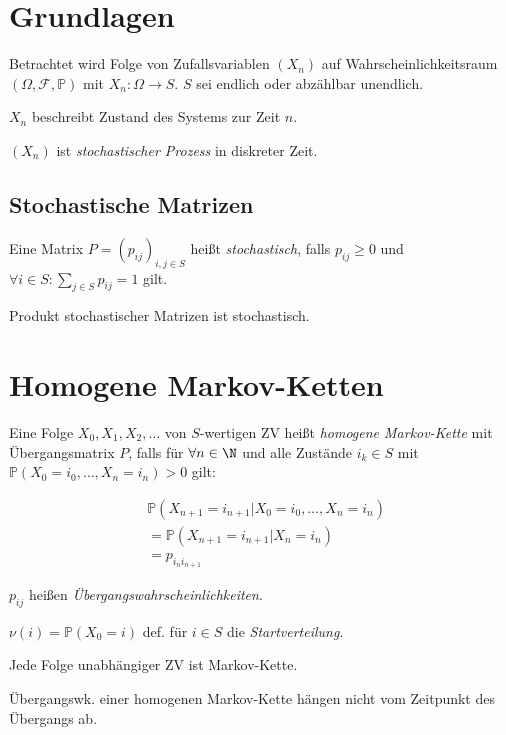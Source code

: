 \newcommand{\F}{\mathcal{F}}
\renewcommand{\P}{\mathbb{P}}

\section*{Grundlagen}

Betrachtet wird Folge von Zufallsvariablen $(X_n)$ auf Wahrscheinlichkeitsraum $(\Omega,\F,\P)$ mit $X_n : \Omega \to S$. $S$ sei endlich oder abzählbar unendlich.

$X_n$ beschreibt Zustand des Systems zur Zeit $n$.

$(X_n)$ ist \emph{stochastischer Prozess} in diskreter Zeit.

\subsection*{Stochastische Matrizen}

Eine Matrix $P = (p_{ij})_{i,j \in S}$ heißt \emph{stochastisch}, falls $p_{ij} \geq 0$ und $\forall i \in S : \sum_{j \in S} p_{ij} = 1$ gilt.

Produkt stochastischer Matrizen ist stochastisch.

\section*{Homogene Markov-Ketten}

Eine Folge $X_0, X_1, X_2, \dots$ von $S$-wertigen ZV heißt \emph{homogene Markov-Kette} mit Übergangsmatrix $P$, falls für $\forall n \in \N$ und alle Zustände $i_k \in S$ mit $\P(X_0 = i_0,\dots,X_n = i_n) > 0$ gilt:

\vspace*{-4mm}
\begin{align*}
&\P(X_{n+1} = i_{n+1} | X_0 = i_0, \dots, X_n = i_n) \\
&= \P(X_{n+1} = i_{n+1} | X_n = i_n) \\
&= p_{i_n i_{n+1}}
\end{align*}

$p_{ij}$ heißen \emph{Übergangswahrscheinlichkeiten}.

$\nu(i) = \P(X_0=i)$ def. für $i \in S$ die \emph{Startverteilung}.

\vspace*{2mm}

Jede Folge unabhängiger ZV ist Markov-Kette.

Übergangswk. einer homogenen Markov-Kette hängen nicht vom Zeitpunkt des Übergangs ab.

